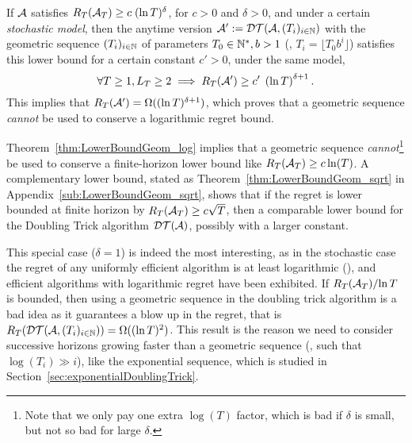 \documentclass[12pt]{colt2018} %
\begin{document}
\begin{theorem}\label{thm:LowerBoundGeom_log}
    If $\mathcal{A}$ satisfies
    $ R_T(\mathcal{A}_T) \geq c \; (\ln T)^{\delta}$,
    for $c > 0$ and $\delta>0$,
    and under a certain \emph{stochastic model},
    then the anytime version $\mathcal{A}':=\mathcal{DT}(\mathcal{A}, (T_i)_{i\in\mathbb{N}})$ with the geometric sequence $(T_i)_{i\in\mathbb{N}}$ of parameters $T_0\in\mathbb{N}^*,b>1$ (\ie, $T_i = \lfloor T_0 b^i \rfloor$) satisfies this lower bound for a certain constant $c' > 0$,
    under the same model,
    \begin{equation}\label{eq:LowerBoundGeom_log_1}
        \forall T \geq 1,
        L_T \geq 2 \implies
        R_T(\mathcal{A}') \geq
        c' \; \left(\ln T\right)^{\delta+1}.
    \end{equation}
    This implies that $R_T(\mathcal{A}') = \Omega((\ln T)^{\delta+1})$, which proves that a geometric sequence \emph{cannot} be used to conserve a logarithmic regret bound.
\end{theorem}


Theorem~\ref{thm:LowerBoundGeom_log} implies that a geometric sequence \emph{cannot}\footnote{Note that we only pay one extra $\log(T)$ factor, which is bad if $\delta$ is small, but not so bad for large $\delta$.} be used to conserve a finite-horizon lower bound like $R_T(\mathcal{A}_T) \geq c \ln(T)$. A complementary lower bound, stated as Theorem~\ref{thm:LowerBoundGeom_sqrt} in Appendix~\ref{sub:LowerBoundGeom_sqrt}, shows that if the regret is lower bounded at finite horizon by $R_T(\mathcal{A}_T) \geq c \sqrt{T}$, then a comparable lower bound for the Doubling Trick algorithm $\mathcal{DT}(\mathcal{A})$, possibly with a larger constant.
%

This special case ($\delta=1$) is indeed the most interesting, as in the stochastic case the regret of any uniformly efficient algorithm is at least logarithmic (\cite{LaiRobbins85}), and efficient algorithms with logarithmic regret have been exhibited.
%
%
%
If $R_T(\mathcal{A}_T)/{\ln T}$ is bounded, then using a geometric sequence in the doubling trick algorithm is a bad idea as it guarantees a blow up in the regret, that is $R_T(\mathcal{DT}(\mathcal{A}, (T_i)_{i\in\mathbb{N}})) = \Omega((\ln T)^2)$.
%
This result is the reason we need to consider successive horizons growing faster than a geometric sequence (\ie, such that $\log(T_i) \gg i$),
like the exponential sequence, which is studied in Section~\ref{sec:exponentialDoublingTrick}.
\end{document}
